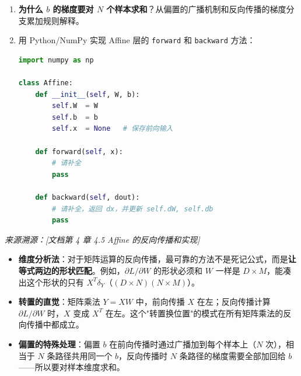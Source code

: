\documentclass[a4paper,11pt]{ctexart}
\begin{document}
\begin{problembox}
\begin{enumerate}[(1)]
        \item \textbf{为什么 $b$ 的梯度要对 $N$ 个样本求和}？从偏置的广播机制和反向传播的梯度分支累加规则解释。

        \item 用 Python/NumPy 实现 Affine 层的 \texttt{forward} 和 \texttt{backward} 方法：
        \begin{lstlisting}[language=Python]
import numpy as np

class Affine:
    def __init__(self, W, b):
        self.W  = W
        self.b  = b
        self.x  = None   # 保存前向输入

    def forward(self, x):
        # 请补全
        pass

    def backward(self, dout):
        # 请补全，返回 dx，并更新 self.dW, self.db
        pass
        \end{lstlisting}
    \end{enumerate}

    \vspace{0.2cm}
    {\color{gray}\small\textit{来源溯源：[文档第 4 章 4.5 Affine 的反向传播和实现]}}
\end{problembox}

\begin{beginnerbox}
    \begin{itemize}
        \item \textbf{维度分析法}：对于矩阵运算的反向传播，最可靠的方法不是死记公式，而是\textbf{让等式两边的形状匹配}。例如，$\partial L / \partial W$ 的形状必须和 $W$ 一样是 $D \times M$，能凑出这个形状的只有 $X^T \delta_Y$（$(D \times N)(N \times M)$）。
        \item \textbf{转置的直觉}：矩阵乘法 $Y = XW$ 中，前向传播 $X$ 在左；反向传播计算 $\partial L/\partial W$ 时，$X$ 变成 $X^T$ 在左。这个"转置换位置"的模式在所有矩阵乘法的反向传播中都成立。
        \item \textbf{偏置的特殊处理}：偏置 $b$ 在前向传播时通过广播加到每个样本上（$N$ 次），相当于 $N$ 条路径共用同一个 $b$，反向传播时 $N$ 条路径的梯度需要全部加回给 $b$——所以要对样本维度求和。
    \end{itemize}
\end{beginnerbox}
\end{document}
